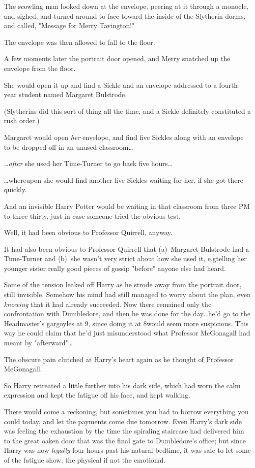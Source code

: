 The scowling man looked down at the envelope, peering at it through a monocle,
and sighed, and turned around to face toward the inside of the Slytherin dorms,
and called, "Message for Merry Tavington!"

The envelope was then allowed to fall to the floor.

A few moments later the portrait door opened, and Merry snatched up the
envelope from the floor.

She would open it up and find a Sickle and an envelope addressed to a
fourth-year student named Margaret Bulstrode.

(Slytherins did this sort of thing all the time, and a Sickle definitely
constituted a rush order.)

Margaret would open \emph{her} envelope, and find five Sickles along with an
envelope to be dropped off in an unused classroom…

…\emph{after} she used her Time-Turner to go back five hours…

…whereupon she would find another five Sickles waiting for her, if she
got there quickly.

And an invisible Harry Potter would be waiting in that classroom from three PM
to three-thirty, just in case someone tried the obvious test.

Well, it had been obvious to Professor Quirrell, anyway.

It had also been obvious to Professor Quirrell that (a)~Margaret Bulstrode had
a Time-Turner and (b)~she wasn't very strict about how she used it, e.g\.
telling her younger sister really good pieces of gossip "before" anyone else
had heard.

Some of the tension leaked off Harry as he strode away from the portrait door,
still invisible. Somehow his mind had still managed to worry about the plan,
even \emph{knowing} that it had already succeeded. Now there remained only the
confrontation with Dumbledore, and then he was done for the day…he'd go
to the Headmaster's gargoyles at 9\PM, since doing it at 8\PM would seem more
suspicious. This way he could claim that he'd just misunderstood what Professor
McGonagall had meant by "afterward"…

The obscure pain clutched at Harry's heart again as he thought of Professor
McGonagall.

So Harry retreated a little further into his dark side, which had worn the calm
expression and kept the fatigue off his face, and kept walking.

There would come a reckoning, but sometimes you had to borrow everything you
could today, and let the payments come due tomorrow.
\later
Even Harry's dark side was feeling the exhaustion by the time the spiraling
staircase had delivered him to the great oaken door that was the final gate to
Dumbledore's office; but since Harry was now \emph{legally} four hours past his
natural bedtime, it was safe to let some of the fatigue show, the physical if
not the emotional.

